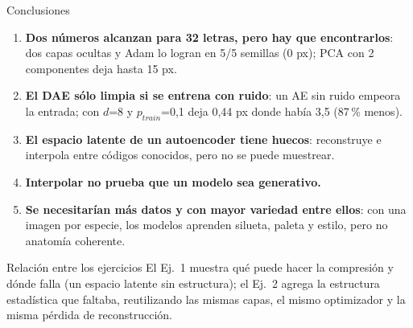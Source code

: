 \documentclass[aspectratio=169]{beamer}
\begin{document}
\begin{frame}{Conclusiones}
  \footnotesize
  \begin{enumerate}
    \item \textbf{Dos n\'umeros alcanzan para 32 letras, pero hay que encontrarlos}: dos capas ocultas y Adam lo logran en 5/5 semillas (0 px); PCA con 2 componentes deja hasta 15 px.
    \item \textbf{El DAE s\'olo limpia si se entrena con ruido}: un AE sin ruido empeora la entrada; con $d$=8 y $p_{train}$=0,1 deja 0,44 px donde hab\'ia 3,5 (87\,\% menos).
    \item \textbf{El espacio latente de un autoencoder tiene huecos}: reconstruye e interpola entre c\'odigos conocidos, pero no se puede muestrear.
    \item \textbf{Interpolar no prueba que un modelo sea generativo.}
    \item \textbf{Se necesitar\'ian m\'as datos y con mayor variedad entre ellos}: con una imagen por especie, los modelos aprenden silueta, paleta y estilo, pero no anatom\'ia coherente.
  \end{enumerate}
  \vspace{0.15cm}
  \begin{block}{Relaci\'on entre los ejercicios}
    \scriptsize
    El Ej.\ 1 muestra qu\'e puede hacer la compresi\'on y d\'onde falla (un espacio latente sin estructura); el Ej.\ 2 agrega la estructura estad\'istica que faltaba, reutilizando las mismas capas, el mismo optimizador y la misma p\'erdida de reconstrucci\'on.
  \end{block}
\end{frame}
\end{document}
